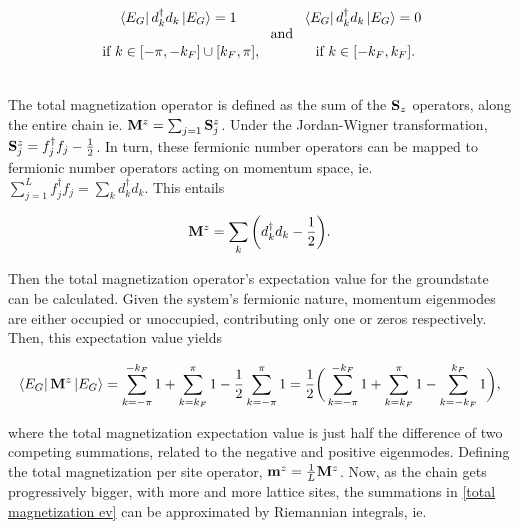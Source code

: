 \documentclass{homework}
\begin{document}
\begin{equation}
    \begin{array}{c}
         \bra{E_G} d_k^\dagger d_k \ket{E_G} = 1  \\
         \\
         \textnormal{ if } k \in [-\pi, -k_F] \cup [k_F, \pi],
    \end{array} \textnormal{ and }  \begin{array}{c}
         \bra{E_G} d_k^\dagger d_k \ket{E_G} = 0  \\
         \\
         \textnormal{ if } k \in [-k_F, k_F].
    \end{array}
\end{equation}

\blanky \\

The total magnetization operator is defined as the sum of the ${\bf S}_z$ operators, along the entire chain ie. ${\bf M}^z = \sum_{j=1} {\bf S}^z_j$. Under the Jordan-Wigner transformation, ${\bf S}^z_j = f_j^\dagger f_j - \frac{1}{2}$. In turn, these fermionic number operators can be mapped to fermionic number operators acting on momentum space, ie. $\sum_{j=1}^{L} f_j^\dagger f_j = \sum_k d_k^\dagger d_k$. This entails

\begin{equation}
    {\bf M}^z = \sum_{k} \bigg(d_k^\dagger d_k - \frac{1}{2}\bigg).
\end{equation}

Then the total magnetization operator's expectation value for the groundstate can be calculated. Given the system's fermionic nature, momentum eigenmodes are either occupied or unoccupied, contributing only one or zeros respectively. Then, this expectation value yields

\begin{equation}
    \bra{E_G} {{\bf M}^z} \ket{E_G} = \sum_{k=-\pi}^{-k_F} 1 + \sum_{k=k_F}^{\pi} 1 - \frac{1}{2} \sum_{k=-\pi}^{\pi} 1 \\
    = \frac{1}{2} \bigg( \sum_{k=-\pi}^{-k_F} 1 + \sum_{k=k_F}^{\pi} 1 - \sum_{k = -k_F}^{k_F} 1  \bigg), \label{total magnetization ev}
\end{equation}

where the total magnetization expectation value is just half the difference of two competing summations, related to the negative and positive eigenmodes. Defining the total magnetization per site operator, ${{\bf m}}^z = \frac{1}{L} {\bf M}^z$. Now, as the chain gets progressively bigger, with more and more lattice sites, the summations in \eqref{total magnetization ev} can be approximated by Riemannian integrals, ie.
\end{document}
